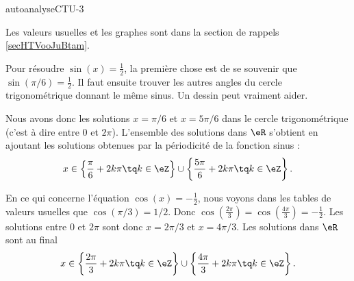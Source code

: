 
\begin{corrige}{autoanalyseCTU-3}

    \begin{wrapfigure}{r}{5.0cm}
   \vspace{-0.5cm}        %
   \centering
   
\end{wrapfigure}

Les valeurs usuelles et les graphes sont dans la section de rappels \ref{secHTVooJuBtam}.

Pour résoudre \( \sin(x)=\frac{ 1 }{2}\), la première chose est de se souvenir que \( \sin(\pi/6)=\frac{ 1 }{2}\). Il faut ensuite trouver les autres angles du cercle trigonométrique donnant le même sinus. Un dessin peut vraiment aider.

%   

Nous avons donc les solutions \( x=\pi/6\) et \( x=5\pi/6\) dans le cercle trigonométrique (c'est à dire entre \( 0\) et \( 2\pi\)). L'ensemble des solutions dans \( \eR\) s'obtient en ajoutant les solutions obtenues par la périodicité de la fonction sinus :
\begin{equation}
    x\in\left\{ \frac{ \pi }{ 6 }+2k\pi\tq k\in \eZ \right\}\cup\left\{ \frac{ 5\pi }{ 6 }+2k\pi\tq k\in \eZ \right\}.
\end{equation}

En ce qui concerne l'équation \( \cos(x)=-\frac{ 1 }{2}\), nous voyons dans les tables de valeurs usuelles que \( \cos(\pi/3)=1/2\). Donc \( \cos(\frac{ 2\pi }{ 3 })=\cos(\frac{ 4\pi }{ 3 })=-\frac{ 1 }{2}\). Les solutions entre \( 0\) et \( 2\pi\) sont donc \( x=2\pi/3\) et \( x=4\pi/3\). Les solutions dans \( \eR\) sont au final
\begin{equation}
    x\in\left\{ \frac{ 2\pi }{ 3 }+2k\pi\tq k\in \eZ \right\}\cup\left\{ \frac{ 4\pi }{ 3 }+2k\pi\tq k\in \eZ \right\}.
\end{equation}

\end{corrige}   
